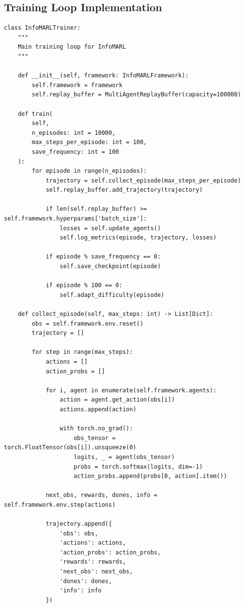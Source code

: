 \documentclass[10pt, letterpaper]{article}
\begin{document}
\subsection{Training Loop Implementation}

\begin{lstlisting}
class InfoMARLTrainer:
    """
    Main training loop for InfoMARL
    """

    def __init__(self, framework: InfoMARLFramework):
        self.framework = framework
        self.replay_buffer = MultiAgentReplayBuffer(capacity=100000)

    def train(
        self,
        n_episodes: int = 10000,
        max_steps_per_episode: int = 100,
        save_frequency: int = 100
    ):
        for episode in range(n_episodes):
            trajectory = self.collect_episode(max_steps_per_episode)
            self.replay_buffer.add_trajectory(trajectory)

            if len(self.replay_buffer) >= self.framework.hyperparams['batch_size']:
                losses = self.update_agents()
                self.log_metrics(episode, trajectory, losses)

            if episode % save_frequency == 0:
                self.save_checkpoint(episode)

            if episode % 100 == 0:
                self.adapt_difficulty(episode)

    def collect_episode(self, max_steps: int) -> List[Dict]:
        obs = self.framework.env.reset()
        trajectory = []

        for step in range(max_steps):
            actions = []
            action_probs = []

            for i, agent in enumerate(self.framework.agents):
                action = agent.get_action(obs[i])
                actions.append(action)

                with torch.no_grad():
                    obs_tensor = torch.FloatTensor(obs[i]).unsqueeze(0)
                    logits, _ = agent(obs_tensor)
                    probs = torch.softmax(logits, dim=-1)
                    action_probs.append(probs[0, action].item())

            next_obs, rewards, dones, info = self.framework.env.step(actions)

            trajectory.append({
                'obs': obs,
                'actions': actions,
                'action_probs': action_probs,
                'rewards': rewards,
                'next_obs': next_obs,
                'dones': dones,
                'info': info
            })


\end{lstlisting}
\end{document}
